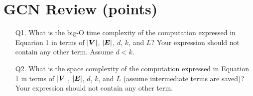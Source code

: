 \section{GCN Review (\qone points)}
\label{sec:gcn}

\begin{enumerate}
    \item [Q1.] What is the big-O time complexity of the computation expressed in Equarion 1 in terms of $|{\bm{V}}|$, $|{\bm{E}}|$, $d$, $k$, and $L$? Your expression should not contain any other term. Assume $d < k$.

\begin{soln}
    
\end{soln}
    \item [Q2.] What is the space complexity of the computation expressed in Equation 1 in terms of $|{\bm{V}}|$, $|{\bm{E}}|$, $d$, $k$, and $L$ (assume intermediate terms are saved)? Your expression should not contain any other term.
    
\begin{soln}
    
\end{soln}
\end{enumerate}

